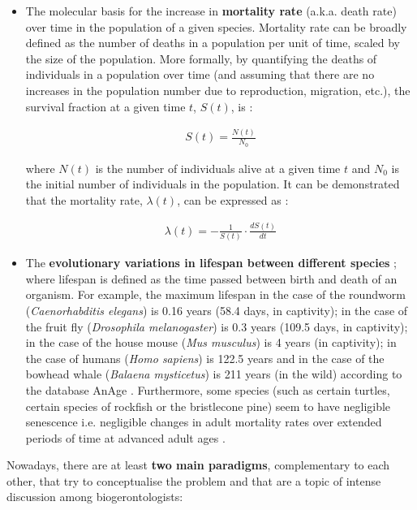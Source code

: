 \begin{itemize}
	
	\item The molecular basis for the increase in \textbf{mortality rate} (a.k.a. death rate) over time in the population of a given species. Mortality rate can be broadly defined as the number of deaths in a population per unit of time, scaled by the size of the population. More formally, by quantifying the deaths of individuals in a population over time (and assuming that there are no increases in the population number due to reproduction, migration, \acrshort{etc.}), the survival fraction at a given time $t$, $S(t)$, is \citep{Witten1986}:
	
	\begin{align} \label{eq:1.1}
	S(t) = \frac{N(t)}{N_0}
	\end{align}
	
	where $N(t)$ is the number of individuals alive at a given time $t$ and $N_0$ is the initial number of individuals in the population. It can be demonstrated that the mortality rate, $\lambda(t)$, can be expressed as \citep{Witten1986}:
	
	\begin{align} \label{eq:1.2}
	\lambda(t) = - \frac{1}{S(t)} \cdot \frac{dS(t)}{dt}
	\end{align}
	
	\item The \textbf{evolutionary variations in lifespan between different species} \citep{Jones2013}; where lifespan is defined as the time passed between birth and death of an organism. For example, the maximum lifespan in the case of the roundworm (\textit{Caenorhabditis elegans}) is 0.16 years (58.4 days, in captivity); in the case of the fruit fly (\textit{Drosophila melanogaster}) is 0.3 years (109.5 days, in captivity); in the case of the house mouse (\textit{Mus musculus}) is 4 years (in captivity); in the case of humans (\textit{Homo sapiens}) is 122.5 years and in the case of the bowhead whale (\textit{Balaena mysticetus}) is 211 years (in the wild) according to the database AnAge \citep{DEMAGALHAES2009}. Furthermore, some species (such as certain turtles, certain species of rockfish or the bristlecone pine) seem to have negligible senescence \acrshort{i.e.} negligible changes in adult mortality rates over extended periods of time at advanced adult ages \citep{Finch2009}.   
	
\end{itemize}

Nowadays, there are at least \textbf{two main paradigms}, complementary to each other, that try to conceptualise the problem and that are a topic of intense discussion among biogerontologists:


